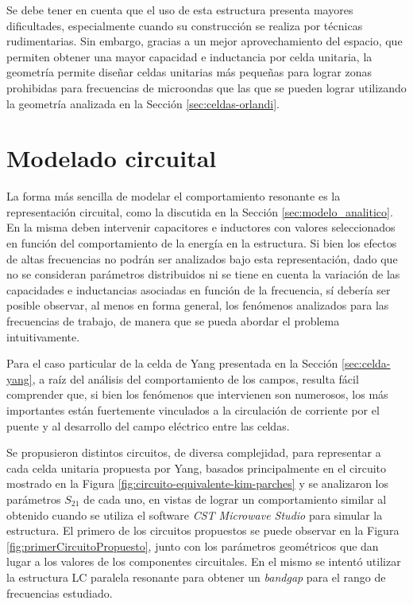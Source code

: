 Se debe tener en cuenta que el uso de esta estructura presenta mayores dificultades, especialmente cuando su construcción se realiza por técnicas rudimentarias. Sin embargo, gracias a un mejor aprovechamiento del espacio, que permiten obtener una mayor capacidad e inductancia por celda unitaria, la geometría permite diseñar celdas unitarias más pequeñas para lograr zonas prohibidas para frecuencias de microondas que las que se pueden lograr utilizando la geometría analizada en la Sección \ref{sec:celdas-orlandi}.



\section{Modelado circuital}

La forma más sencilla de modelar el comportamiento resonante es la representación circuital, como la discutida en la Sección \ref{sec:modelo_analitico}. En la misma deben intervenir capacitores e inductores con valores seleccionados en función del comportamiento de la energía en la estructura. Si bien los efectos de altas frecuencias no podrán ser analizados bajo esta representación, dado que no se consideran parámetros distribuidos ni se tiene en cuenta la variación de las capacidades e inductancias asociadas en función de la frecuencia, sí debería ser posible observar, al menos en forma general, los fenómenos analizados para las frecuencias de trabajo, de manera que se pueda abordar el problema intuitivamente.

Para el caso particular de la celda de Yang presentada en la Sección \ref{sec:celda-yang}, a raíz del análisis del comportamiento de los campos, resulta fácil comprender que, si bien los fenómenos que intervienen son numerosos, los más importantes están fuertemente vinculados a la circulación de corriente por el puente y al desarrollo del campo eléctrico entre las celdas.

Se propusieron distintos circuitos, de diversa complejidad, para representar a cada celda unitaria propuesta por Yang, basados principalmente en el circuito mostrado en la Figura \ref{fig:circuito-equivalente-kim-parches} y se analizaron los parámetros $S_{21}$ de cada uno, en vistas de lograr un comportamiento similar al obtenido cuando se utiliza el software \textit{CST Microwave Studio} para simular la estructura. El primero de los circuitos propuestos se puede observar en la Figura \ref{fig:primerCircuitoPropuesto}, junto con los parámetros geométricos que dan lugar a los valores de los componentes circuitales. En el mismo se intentó utilizar la estructura LC paralela resonante para obtener un \textit{bandgap} para el rango de frecuencias estudiado.

